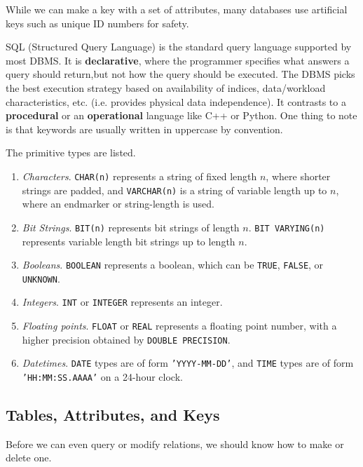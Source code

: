 \documentclass{article}
\begin{document}
  While we can make a key with a set of attributes, many databases use artificial keys such as unique ID numbers for safety. 

  SQL (Structured Query Language) is the standard query language supported by most DBMS. It is \textbf{declarative}, where the programmer specifies what answers a query should return,but not how the query should be executed. The DBMS picks the best execution strategy based on availability of indices, data/workload characteristics, etc. (i.e. provides physical data independence). It contrasts to a \textbf{procedural} or an \textbf{operational} language like C++ or Python. One thing to note is that keywords are usually written in uppercase by convention. 

  \begin{definition}
    The primitive types are listed. 
    \begin{enumerate}
      \item \textit{Characters}. \texttt{CHAR(n)} represents a string of fixed length $n$, where shorter strings are padded, and \texttt{VARCHAR(n)} is a string of variable length up to $n$, where an endmarker or string-length is used. 
      \item \textit{Bit Strings}. \texttt{BIT(n)} represents bit strings of length $n$. \texttt{BIT VARYING(n)} represents variable length bit strings up to length $n$. 
      \item \textit{Booleans}. \texttt{BOOLEAN} represents a boolean, which can be \texttt{TRUE}, \texttt{FALSE}, or \texttt{UNKNOWN}. 
      \item \textit{Integers}. \texttt{INT} or \texttt{INTEGER} represents an integer. 
      \item \textit{Floating points}. \texttt{FLOAT} or \texttt{REAL} represents a floating point number, with a higher precision obtained by \texttt{DOUBLE PRECISION}. 
      \item \textit{Datetimes}. \texttt{DATE} types are of form \texttt{'YYYY-MM-DD'}, and \texttt{TIME} types are of form \texttt{'HH:MM:SS.AAAA'} on a 24-hour clock. 
    \end{enumerate}
  \end{definition}

  \subsection{Tables, Attributes, and Keys}

    Before we can even query or modify relations, we should know how to make or delete one. 
\end{document}
